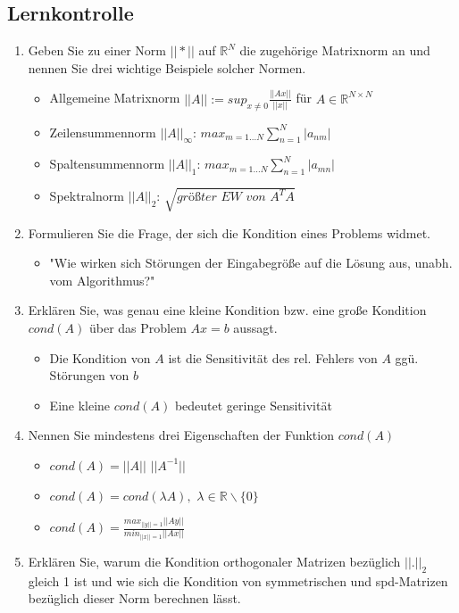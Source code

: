 \documentclass[]{article}
\begin{document}
\subsection{Lernkontrolle}
	\begin{enumerate}
		\item Geben Sie zu einer Norm $|| * ||$ auf $\mathbb{R}^N$ die zugehörige Matrixnorm an und nennen Sie drei wichtige Beispiele solcher Normen.
			\begin{itemize}
				\item Allgemeine Matrixnorm $||A|| := sup_{x \neq 0} \frac{||Ax||}{||x||}$ für $A \in \mathbb{R}^{N \times N}$
				\item Zeilensummennorm $||A||_\infty$: $max_{m=1 \dots N} \sum_{n=1}^{N}|a_{nm}|$
				\item Spaltensummennorm $||A||_1$: $max_{m=1 \dots N} \sum_{n=1}^{N}|a_{mn}|$
				\item Spektralnorm $||A||_2$: $\sqrt{\textit{größter EW von }A^T A}$
			\end{itemize}
		\item Formulieren Sie die Frage, der sich die Kondition eines Problems widmet.
			\begin{itemize}
				\item "Wie wirken sich Störungen der Eingabegröße auf die Lösung aus, unabh. vom Algorithmus?"
			\end{itemize}
		\item Erklären Sie, was genau eine kleine Kondition bzw. eine große Kondition $cond(A)$ über das Problem $Ax=b$ aussagt.
			\begin{itemize}
				\item Die Kondition von $A$ ist die Sensitivität des rel. Fehlers von $A$ ggü. Störungen von $b$
				\item Eine kleine $cond(A)$ bedeutet geringe Sensitivität
			\end{itemize}
		\item Nennen Sie mindestens drei Eigenschaften der Funktion $cond(A)$
			\begin{itemize}
				\item $cond(A) = ||A||$ $||A^{-1}||$
				\item $cond(A) = cond(\lambda A),$ \quad $\lambda \in \mathbb{R} \backslash \{0\}$
				\item $cond(A) = \frac{max_{||y||=1}  ||Ay||}{min_{||x||=1} ||Ax||}$
			\end{itemize}
		\item Erklären Sie, warum die Kondition orthogonaler Matrizen bezüglich $||.||_2$ gleich 1 ist und wie sich die Kondition von symmetrischen und spd-Matrizen bezüglich dieser Norm berechnen lässt.  

\end{enumerate}
\end{document}
